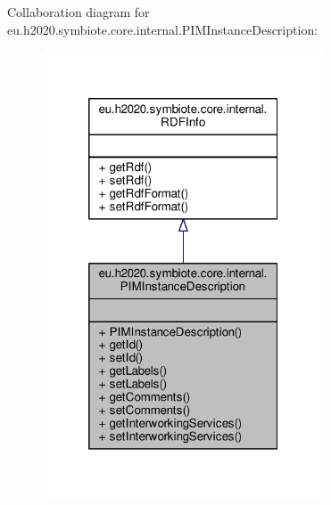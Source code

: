 Collaboration diagram for eu.\+h2020.\+symbiote.\+core.\+internal.\+P\+I\+M\+Instance\+Description\+:
\nopagebreak
\begin{figure}[H]
\begin{center}
\leavevmode
\includegraphics[width=236pt]{classeu_1_1h2020_1_1symbiote_1_1core_1_1internal_1_1PIMInstanceDescription__coll__graph}
\end{center}
\end{figure}
